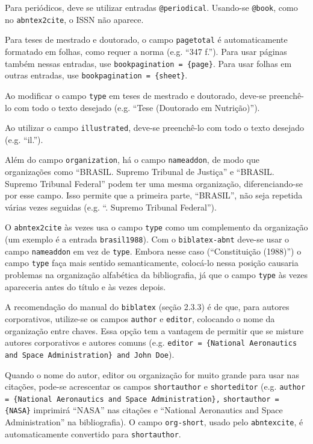 \documentclass[a4paper]{article}
\begin{document}
\begin{itemize}
\begin{sloppypar}
    \item Para periódicos, deve se utilizar entradas \texttt{@periodical}. Usando-se \texttt{@book}, como no \texttt{abntex2cite}, o ISSN não aparece.
    \item Para teses de mestrado e doutorado, o campo \texttt{pagetotal} é automaticamente formatado em folhas, como requer a norma (e.g. ``347 f.''). Para usar páginas também nessas entradas, use \texttt{bookpagination = \{page\}}. Para usar folhas em outras entradas, use \texttt{bookpagination = \{sheet\}}.
    \item Ao modificar o campo \texttt{type} em teses de mestrado e doutorado, deve-se preenchê-lo com todo o texto desejado (e.g. ``Tese (Doutorado em Nutrição)'').
    \item Ao utilizar o campo \texttt{illustrated}, deve-se preenchê-lo com todo o texto desejado (e.g. ``il.'').
    \item Além do campo \texttt{organization}, há o campo \texttt{nameaddon}, de modo que organizações como ``BRASIL. Supremo Tribunal de Justiça'' e ``BRASIL. Supremo Tribunal Federal'' podem ter uma mesma organização, diferenciando-se por esse campo. Isso permite que a primeira parte, ``BRASIL'', não seja repetida várias vezes seguidas (e.g. ``\underline{\hspace*{4em}}. Supremo Tribunal Federal'').
    \item O \texttt{abntex2cite} às vezes usa o campo \texttt{type} como um complemento da organização (um exemplo é a entrada \texttt{brasil1988}). Com o \texttt{biblatex-abnt} deve-se usar o campo \texttt{nameaddon} em vez de \texttt{type}. Embora nesse caso (``Constituição (1988)'') o campo \texttt{type} faça mais sentido semanticamente, colocá-lo nessa posição causaria problemas na organização alfabética da bibliografia, já que o campo \texttt{type} às vezes apareceria antes do título e às vezes depois.
    \item A recomendação do manual do \texttt{biblatex} (seção 2.3.3) é de que, para autores corporativos, utilize-se os campos \texttt{author} e \texttt{editor}, colocando o nome da organização entre chaves. Essa opção tem a vantagem de permitir que se misture autores corporativos e autores comuns (e.g. \texttt{editor = \{National Aeronautics and Space Administration\} and John Doe}).
    \item Quando o nome do autor, editor ou organização for muito grande para usar nas citações, pode-se acrescentar os campos \texttt{short\-author} e \texttt{short\-editor} (e.g. \texttt{author = \{National Aeronautics and Space Ad\-min\-is\-tra\-tion\},} \texttt{short\-author = \{NASA\}} imprimirá ``NASA'' nas citações e ``National Aeronautics and Space Administration'' na bibliografia). O campo \texttt{org-short}, usado pelo \texttt{abntex\-cite}, é automaticamente convertido para \texttt{shortauthor}.

\end{sloppypar}
\end{itemize}
\end{document}
